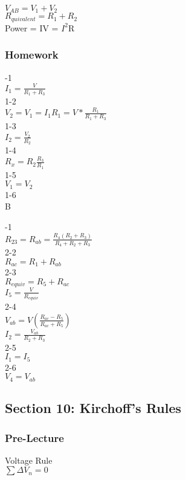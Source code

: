 \documentclass{article}
\begin{document}
\noindent
$V_{AB} = V_1+V_2 $ \\
$R_{quivalent} = R_1 + R_2$ \\
Power = IV = $I^2$R

\subsubsection{Homework}

-1 \\
$I_1 = \frac{V}{R_1 + R_3}$ \\
1-2 \\
$V_2 = V_1 = I_1 R_1 = V * \frac{R_1}{R_1 + R_3}$ \\
1-3 \\
$I_2 = \frac{V_2}{R_2}$ \\
1-4 \\
$R_x = R_2 \frac{R_3}{R_1}$ \\
1-5 \\
$V_1 = V_2$ \\
1-6 \\
B

\vspace{2mm}

-1 \\
$ R_{23} = R_{ab} = \frac{R_4 (R_2 + R_3)}{R_4 + R_2 + R_3}$ \\
2-2 \\
$R_{ac} = R_1 + R_{ab}$ \\
2-3 \\
$R_{equiv} = R_5 + R_{ac}$ \\
$I_5 = \frac{V}{R_{equiv}}$ \\
2-4 \\
$V_{ab} = V (\frac{R_{ac} - R_5}{R_{ac} + R_5})$ \\
$I_2 = \frac{V_{ab}}{R_2 + R_3}$ \\
2-5 \\
$I_1 = I_5$ \\
2-6 \\
$V_4 = V_{ab}$

\subsection{Section 10: Kirchoff's Rules}
\subsubsection{Pre-Lecture}
\noindent
Voltage Rule \\
$\sum \Delta V_n = 0$
\end{document}
